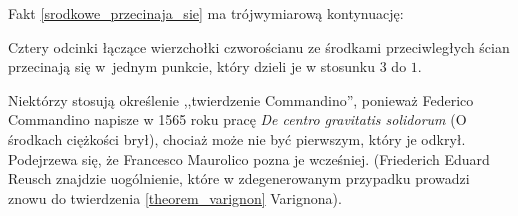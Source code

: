 Fakt \ref{srodkowe_przecinaja_sie} ma trójwymiarową kontynuację:

\begin{proposition}
    Cztery odcinki łączące wierzchołki czworościanu ze środkami przeciwległych ścian przecinają się w~jednym punkcie, który dzieli je w stosunku $3$ do $1$.
\end{proposition}

Niektórzy stosują określenie ,,twierdzenie Commandino'', ponieważ Federico Commandino napisze w 1565 roku pracę \emph{De centro gravitatis solidorum} (O środkach ciężkości brył), chociaż może nie być pierwszym, który je odkrył.
%
%
Podejrzewa się, że Francesco Maurolico pozna je wcześniej.
(Friederich Eduard Reusch znajdzie uogólnienie, które w zdegenerowanym przypadku prowadzi znowu do twierdzenia \ref{theorem_varignon} Varignona).
%